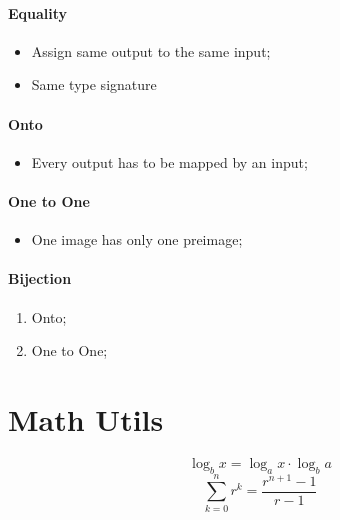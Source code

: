 \documentclass[letterpaper, 11pt]{article}
\begin{document}
      \paragraph{Equality}
      \begin{itemize}
        \item Assign same output to the same input;
        \item Same type signature
      \end{itemize}
      
      \paragraph{Onto}
      \begin{itemize}
        \item Every output has to be mapped by an input;
      \end{itemize}
      
      \paragraph{One to One}
      \begin{itemize}
        \item One image has only one preimage;
      \end{itemize}
      
      \paragraph{Bijection}
      \begin{enumerate}
        \item Onto;
        \item One to One;
      \end{enumerate}
      
  \section{Math Utils}
    \begin{equation}
      \log_{b} x = \log_{a} x \cdot \log_{b} a
    \end{equation}
    \begin{equation}
      \sum_{k = 0}^{n} r^{k} = \frac{ r^{n + 1} - 1 }{ r - 1 }
    \end{equation}
\end{document}
